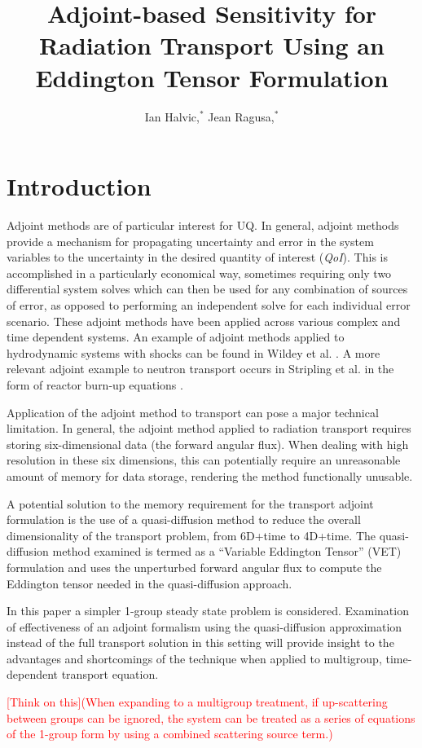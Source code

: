 \documentclass{anstrans}
\title{Adjoint-based Sensitivity for Radiation Transport Using an Eddington Tensor Formulation}
\author{Ian Halvic,$^{*}$ Jean Ragusa,$^{*}$}
\institute{
$^{*}$ Texas A\&M University,
College Station, TX, iwhalvic@tamu.edu}
\newcommand{\qoi}{{\it QoI}\xspace}
\newcommand{\tcr}[1]{\textcolor{red}{#1}}
\begin{document}
\section{Introduction}


Adjoint methods are of particular interest for UQ. In general, adjoint methods provide a mechanism for propagating uncertainty and error in the system variables to the uncertainty in the desired quantity of interest (\qoi). This is accomplished in a particularly economical way, sometimes requiring only two differential system solves which can then be used for any combination of sources of error, as opposed to performing an independent solve for each individual error scenario. These adjoint methods have been applied across various complex and time dependent systems. An example of adjoint methods applied to hydrodynamic systems with shocks can be found in Wildey et al. \cite{Wildey}. A more relevant adjoint example to neutron transport occurs in Stripling et al. in the form of reactor burn-up equations \cite{Stripling}.


Application of the adjoint method to transport can pose a major technical limitation. In general, the adjoint method applied to radiation transport requires storing six-dimensional data (the forward angular flux). When dealing with high resolution in these six dimensions, this can potentially require an unreasonable amount of memory for data storage, rendering the method functionally unusable. 

A potential solution to the memory requirement for the transport adjoint formulation is the use of a quasi-diffusion method to reduce the overall dimensionality of the transport problem, from 6D+time to 4D+time. The quasi-diffusion method examined is termed  as a ``Variable Eddington Tensor'' (VET) formulation and uses the unperturbed forward angular flux to compute the Eddington tensor needed in the quasi-diffusion approach. 

In this paper a simpler 1-group steady state problem is considered. Examination of effectiveness of an adjoint formalism using the quasi-diffusion approximation instead of the full transport solution in this setting will provide insight to the advantages and shortcomings of the technique when applied to multigroup, time-dependent transport equation.

\tcr{[Think on this](When expanding to a multigroup treatment, if up-scattering between groups can be ignored, the system can be treated as a series of equations of the 1-group form by using a combined scattering source term.)}
\end{document}
